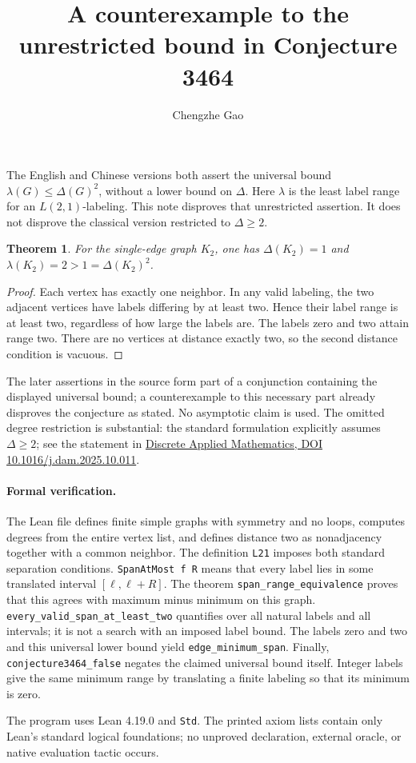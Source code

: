 \documentclass[11pt]{article}
\newtheorem{theorem}{Theorem}
\begin{document}
\title{A counterexample to the unrestricted bound in Conjecture 3464}
\author{Chengzhe Gao}\date{}\maketitle
The English and Chinese versions both assert the universal bound
$\lambda(G)\leq\Delta(G)^2$, without a lower bound on $\Delta$.
Here $\lambda$ is the least label range for an $L(2,1)$-labeling.
This note disproves that unrestricted assertion. It does not disprove
the classical version restricted to $\Delta\geq2$.

\begin{theorem}
For the single-edge graph $K_2$, one has $\Delta(K_2)=1$ and
$\lambda(K_2)=2>1=\Delta(K_2)^2$.
\end{theorem}
\begin{proof}
Each vertex has exactly one neighbor. In any valid labeling, the two
adjacent vertices have labels differing by at least two. Hence their
label range is at least two, regardless of how large the labels are.
The labels zero and two attain range two. There are no vertices at
distance exactly two, so the second distance condition is vacuous.
\end{proof}

The later assertions in the source form part of a conjunction containing
the displayed universal bound; a counterexample to this necessary part
already disproves the conjecture as stated. No asymptotic claim is used.
The omitted degree restriction is substantial: the standard formulation
explicitly assumes $\Delta\geq2$; see the statement in
\href{https://doi.org/10.1016/j.dam.2025.10.011}{Discrete Applied Mathematics,
DOI 10.1016/j.dam.2025.10.011}.

\paragraph{Formal verification.}
The Lean file defines finite simple graphs with symmetry and no loops,
computes degrees from the entire vertex list, and defines distance two
as nonadjacency together with a common neighbor. The definition
\texttt{L21} imposes both standard separation conditions.
\texttt{SpanAtMost f R} means that every label lies in some translated
interval $[\ell,\ell+R]$. The theorem \texttt{span\_range\_equivalence}
proves that this agrees with maximum minus minimum on this graph.
\texttt{every\_valid\_span\_at\_least\_two} quantifies over all natural
labels and all intervals; it is not a search with an imposed label bound.
The labels zero and two and this universal lower bound yield
\texttt{edge\_minimum\_span}. Finally,
\texttt{conjecture3464\_false} negates the claimed universal bound itself.
Integer labels give the same minimum range by translating a finite
labeling so that its minimum is zero.

The program uses Lean 4.19.0 and \texttt{Std}. The printed axiom lists
contain only Lean's standard logical foundations; no unproved declaration,
external oracle, or native evaluation tactic occurs.
\end{document}
